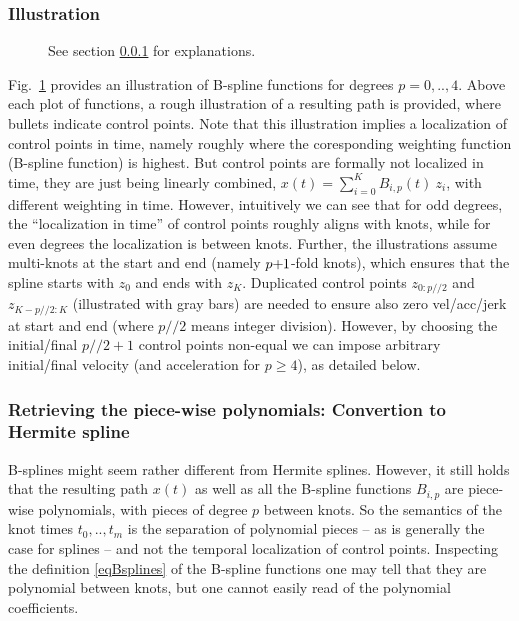 \subsubsection{Illustration}\label{secIll}

\begin{figure}
\caption{\label{figBsplines}
See section \ref{secIll} for explanations.}
\end{figure}

\renewcommand{\div}{/\!\!/}

Fig.~\ref{figBsplines} provides an illustration of B-spline functions
for degrees $p=0,..,4$. Above each plot of functions, a rough
illustration of a resulting path is provided, where bullets indicate
control points. Note that this illustration implies a localization of
control points in time, namely roughly where the coresponding
weighting function (B-spline function) is highest. But control points
are formally not localized in time, they are just being linearly
combined, $x(t) = \sum_{i=0}^K B_{i,p}(t)~ z_i$, with different
weighting in time. However, intuitively we can see that for odd
degrees, the ``localization in time'' of control points roughly aligns
with knots, while for even degrees the localization is between
knots. Further, the illustrations assume multi-knots at the start and
end (namely $p{{\hspace*{-.0pt}\text{\rm +}\hspace*{-.5pt}}1}$-fold knots), which ensures that the spline starts
with $z_0$ and ends with $z_K$. Duplicated control points
$z_{0:p\div2}$ and $z_{K-p\div2:K}$ (illustrated with gray bars) are
needed to ensure also zero vel/acc/jerk at start and end (where
$p\div2$ means integer division). However, by choosing the
initial/final $p\div2+1$ control points non-equal we can impose
arbitrary initial/final velocity (and acceleration for $p\ge 4$), as
detailed below.

\subsubsection{Retrieving the piece-wise polynomials: Convertion to Hermite spline}

B-splines might seem rather different from Hermite splines. However,
it still holds that the resulting path $x(t)$ as well as all the
B-spline functions $B_{i,p}$ are piece-wise polynomials, with pieces
of degree $p$ between knots. So the semantics of the knot times
$t_0,..,t_m$ is the separation of polynomial pieces -- as is generally
the case for splines -- and not the temporal localization of control
points. Inspecting the definition \eqref{eqBsplines} of the B-spline
functions one may tell that they are polynomial between knots, but one
cannot easily read of the polynomial coefficients.


